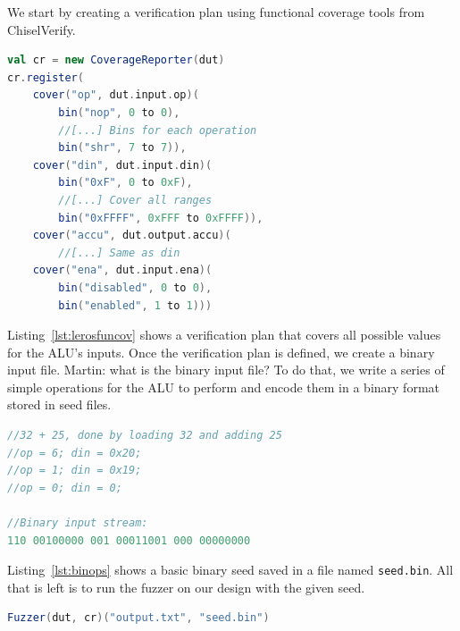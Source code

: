\documentclass[conference]{IEEEtran}
\newcommand{\martin}[1]{{\color{blue} Martin: #1}}
\begin{document}
We start by creating a verification plan using functional coverage tools from ChiselVerify.
\begin{lstlisting}[captionpos=b,caption={Simple verification plan for the Leros ALU. Since this is still a work-in-progress, the verification plan is simple and only contains basic cover points. The functional coverage code is also abridged since it is not our main focus in this paper.},label={lst:lerosfuncov},language=scala]
val cr = new CoverageReporter(dut)
cr.register(
    cover("op", dut.input.op)(
        bin("nop", 0 to 0),
        //[...] Bins for each operation
        bin("shr", 7 to 7)),
    cover("din", dut.input.din)(
        bin("0xF", 0 to 0xF),
        //[...] Cover all ranges
        bin("0xFFFF", 0xFFF to 0xFFFF)),
    cover("accu", dut.output.accu)(
        //[...] Same as din
    cover("ena", dut.input.ena)(
        bin("disabled", 0 to 0),
        bin("enabled", 1 to 1)))
\end{lstlisting}
Listing~\ref{lst:lerosfuncov} shows a verification plan that covers all possible values for the ALU's inputs.
Once the verification plan is defined, we create a binary input file.
\martin{what is the binary input file?}
To do that, we write a series of simple operations for the ALU to perform and encode them in a binary format stored in seed files.
\begin{lstlisting}[captionpos=b,caption={Basic ALU operations; dut.io.op is 3 bits wide and din is 8 bits wide. Each binary input in the example is separated with a whitespace for clarity.},label={lst:binops},language=C]
//32 + 25, done by loading 32 and adding 25 
//op = 6; din = 0x20; 
//op = 1; din = 0x19;
//op = 0; din = 0;

//Binary input stream:
110 00100000 001 00011001 000 00000000
\end{lstlisting}
Listing~\ref{lst:binops} shows a basic binary seed saved in a file named \texttt{seed.bin}.
All that is left is to run the fuzzer on our design with the given seed.
\begin{lstlisting}[captionpos=b,caption={Call to the fuzzer using the setup previously described.},label={lst:fuzzcall},language=scala]
Fuzzer(dut, cr)("output.txt", "seed.bin")
\end{lstlisting}
\end{document}
